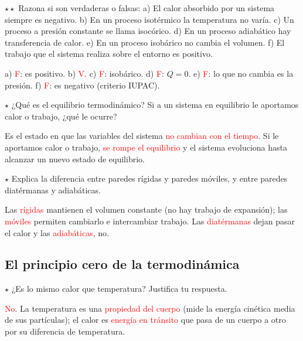 \begin{exercise}
    \(\star\star\) Razona si son verdaderas o falsas: a) El calor absorbido por un sistema siempre es negativo. b) En un proceso
    isotérmico la temperatura no varía. c) Un proceso a presión constante se llama isocórico. d) En un proceso adiabático hay
    transferencia de calor. e) En un proceso isobárico no cambia el volumen. f) El trabajo que el sistema realiza sobre el entorno
    es positivo.
    \begin{solu}
        a) \textcolor{red}{F}: es positivo. b) \textcolor{red}{V}. c) \textcolor{red}{F}: isobárico. d) \textcolor{red}{F}: \(Q =
        0\). e) \textcolor{red}{F}: lo que no cambia es la presión. f) \textcolor{red}{F}: es negativo (criterio IUPAC).
    \end{solu}
\end{exercise}

\begin{exercise}
    \(\star\) ¿Qué es el equilibrio termodinámico? Si a un sistema en equilibrio le aportamos calor o trabajo, ¿qué le ocurre?
    \begin{solu}
        Es el estado en que las variables del sistema \textcolor{red}{no cambian con el tiempo}. Si le aportamos calor o trabajo,
        \textcolor{red}{se rompe el equilibrio} y el sistema evoluciona hasta alcanzar un nuevo estado de equilibrio.
    \end{solu}
\end{exercise}

\begin{exercise}
    \(\star\) Explica la diferencia entre paredes rígidas y paredes móviles, y entre paredes diatérmanas y adiabáticas.
    \begin{solu}
        Las \textcolor{red}{rígidas} mantienen el volumen constante (no hay trabajo de expansión); las \textcolor{red}{móviles}
        permiten cambiarlo e intercambiar trabajo. Las \textcolor{red}{diatérmanas} dejan pasar el calor y las
        \textcolor{red}{adiabáticas}, no.
    \end{solu}
\end{exercise}

\subsection{El principio cero de la termodinámica}

\begin{exercise}
    \(\star\) ¿Es lo mismo calor que temperatura? Justifica tu respuesta.
    \begin{solu}
        \textcolor{red}{No}. La temperatura es una \textcolor{red}{propiedad del cuerpo} (mide la energía cinética media de sus
        partículas); el calor es \textcolor{red}{energía en tránsito} que pasa de un cuerpo a otro por su diferencia de temperatura.
    \end{solu}
\end{exercise}

